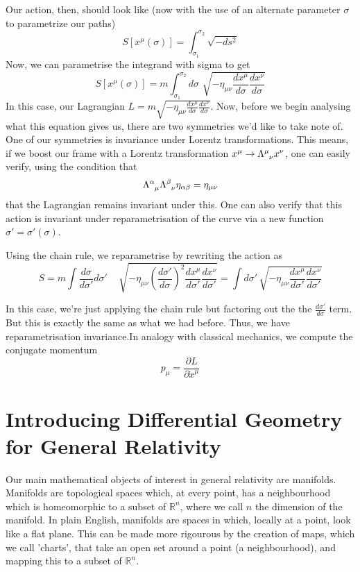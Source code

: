 \documentclass[11pt, a4paper]{article}   	%
\theoremstyle{slplain}
\begin{document}
Our action, then, should look like (now with the use of an alternate parameter $\sigma$ to parametrize our paths) 
\[ 
S[ x^\mu ( \sigma) ] = \int_{ \sigma_1}^{\sigma_2} \sqrt{ - ds^2 } \]
Now, we can parametrise the integrand with sigma to get 
\[ 
S[x^\mu (\sigma) ] = m \int_{\sigma_1}^{ \sigma_2 } d\sigma \, \,  \sqrt{ - \eta_{ \mu \nu} \frac{ d x^\mu}{ d \sigma} \frac{ dx^\nu}{ d \sigma} } 
\] 
In this case, our Lagrangian $L = 
m \sqrt{ - \eta_{ \mu \nu} \frac{ d x^\mu}{ d \sigma} \frac{ dx^\nu}{ d \sigma} }$. Now, before we begin analysing what this equation gives us, there are two symmetries we'd like to take note of. One of our symmetries is invariance under Lorentz transformations. This means, if we boost our frame with a Lorentz transformation $x^\mu \rightarrow \Lambda\indices{^\mu_\nu} x^\nu $, one can easily verify, using the condition that \[ 
\Lambda\indices{^\alpha_\mu} \Lambda\indices{^\beta_\nu} \eta_{\alpha\beta} = \eta_{ \mu \nu} 
\] 
that the Lagrangian remains invariant under this. One can also verify that this action is invariant under reparametrisation of the curve via a new function $\sigma' = \sigma' ( \sigma)$.  

Using the chain rule, we reparametrise by rewriting the action as 
\[ 
S = m \int \frac{d \sigma}{ d \sigma' } d\sigma' \, \quad \sqrt{  - \eta_{ \mu\nu} \left( \frac{ d \sigma' }{ d\sigma} \right)^2 \frac{ dx^\mu}{ d \sigma' } \frac{ dx^\nu}{ d \sigma' } } = \int d \sigma'\,  \sqrt{  - \eta_{ \mu\nu} \frac{ d x^\mu}{ d \sigma'} \frac{ dx^\nu}{ d\sigma'} } \] 

In this case, we're just applying the chain rule but factoring out the the $\frac{ d \sigma ' }{ d \sigma} $ term. But this is exactly the same as what we had before. Thus, we have reparametrisation invariance.In analogy with classical mechanics, we compute the conjugate momentum \[ 
p_\mu = \frac{ \partial L }{ \partial \dot{x}^\mu }  
\] 


\pagebreak 
\section{Introducing Differential Geometry for General Relativity} 
Our main mathematical objects of interest in general relativity are manifolds. Manifolds are topological spaces which, at every point, has a neighbourhood which is homeomorphic to a subset of $\mathbb{R}^n$, where we call $n$ the dimension of the manifold. In plain English, manifolds are spaces in which, locally at a point, look like a flat plane. This can be made more rigourous by the creation of maps, which we call 'charts', that take an open set around a point (a neighbourhood), and mapping this to a subset of $\mathbb{R}^n$. 
\end{document}
